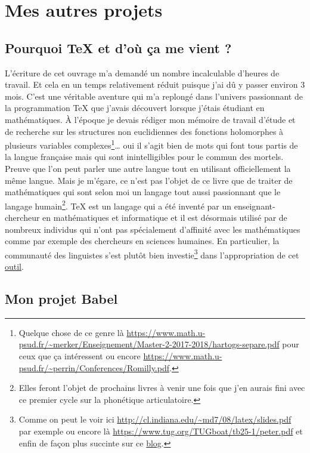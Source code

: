 \chapter{Mes autres projets}\label{chap:projets}

\section{Pourquoi \TeX{} et d'où ça me vient ?}\label{sec:tex}

L'écriture de cet ouvrage m'a demandé un nombre incalculable d'heures
de travail. Et cela en un temps relativement réduit puisque j'ai dû y
passer environ 3 mois. C'est une véritable aventure qui m'a replongé
dans l'univers passionnant de la programmation \TeX{} que j'avais
découvert lorsque j'étais étudiant en mathématiques. À l'époque je
devais rédiger mon mémoire de travail d'étude et de recherche sur les
structures non euclidiennes des fonctions holomorphes à plusieurs
variables complexes\footnote{Quelque chose de ce genre là
  \url{https://www.math.u-psud.fr/~merker/Enseignement/Master-2-2017-2018/hartogs-separe.pdf}
pour ceux que ça intéressent ou encore \url{https://www.math.u-psud.fr/~perrin/Conferences/Romilly.pdf}.}\dots{} oui il s'agit bien de mots qui font tous partis de la
langue française mais qui sont inintelligibles pour le commun des
mortels. Preuve que l'on peut parler une autre langue tout en
utilisant officiellement la même langue. Mais je m'égare, ce n'est pas
l'objet de ce livre que de traiter de mathématiques qui sont selon moi
un langage tout aussi passionnant que le langage humain\footnote{Elles
feront l'objet de prochains livres à venir une fois que j'en aurais
fini avec ce premier cycle sur la phonétique articulatoire.}. \TeX{}
est un langage qui a été inventé par un enseignant-chercheur en
mathématiques et informatique et il est désormais utilisé par de
nombreux individus qui n'ont pas spécialement d'affinité avec les
mathématiques comme par exemple des chercheurs en sciences
humaines. En particulier, la communauté des linguistes s'est plutôt
bien investie\footnote{Comme on peut le voir ici
  \url{http://cl.indiana.edu/~md7/08/latex/slides.pdf} par exemple ou
  encore là \url{https://www.tug.org/TUGboat/tb25-1/peter.pdf} et
  enfin de façon plus succinte sur ce \href{https://allthingslinguistic.com/post/50042310246/what-is-latex-and-why-do-linguists-love-it}{blog}.} dans l'appropriation de cet \href{http://stefanocoretta.altervista.org/xelatex-linguistics/}{outil}.

\section{Mon projet Babel}\label{sec:babel}

